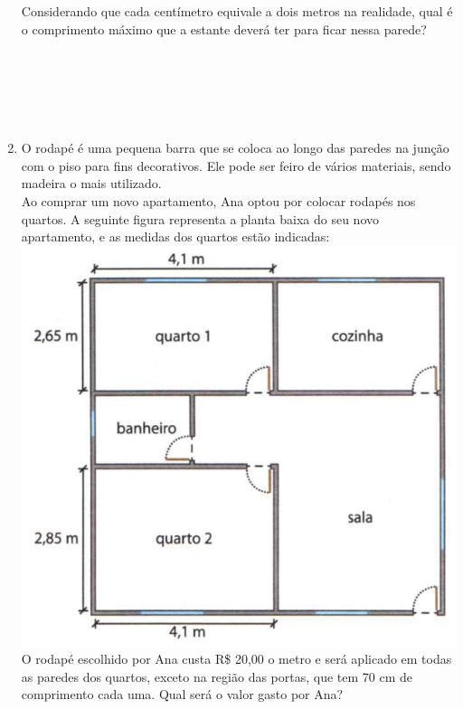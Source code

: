 \documentclass[a4paper,14pt]{article}
\begin{document}
\begin{multicols}{2}
\begin{enumerate}
			Considerando que cada centímetro equivale a dois metros na realidade, qual é o comprimento máximo que a estante deverá ter para ficar nessa parede?  \\\\\\\\\\\\
			\item O rodapé é uma pequena barra que se coloca ao longo das paredes na junção com o piso para fins decorativos. Ele pode ser feiro de vários materiais, sendo madeira o mais utilizado.  \\
			Ao comprar um novo apartamento, Ana optou por colocar rodapés nos quartos. A seguinte figura representa a planta baixa do seu novo apartamento, e as medidas dos quartos estão indicadas:\\
			\includegraphics[width=1.1\linewidth]{6FMA30_imagens/imagem7}
			O rodapé escolhido por Ana custa R\$ 20,00 o metro e será aplicado em todas as paredes dos quartos, exceto na região das portas, que tem 70 cm de comprimento cada uma. Qual será o valor gasto por Ana?  \\\\\\\\\\\\\\\\\\\\\\\\\\\\\\\\\\\\\\\\\\\\

\end{enumerate}
\end{multicols}
\end{document}

